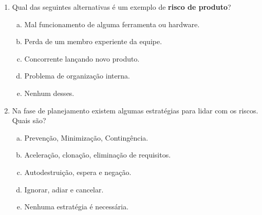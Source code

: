 \documentclass{beamer}
\begin{document}
\begin{frame}
    \begin{enumerate}
        \justifying
        \setcounter{enumi}{10}
        \item<1-2> Qual das seguintes alternativas é um exemplo de \textbf{risco de produto}?
        \begin{enumerate}[a)]
            \justifying
            \item<1-2> \alert<2>{Mal funcionamento de alguma ferramenta ou hardware}.
            \item<1-2> Perda de um membro experiente da equipe.
            \item<1-2> Concorrente lançando novo produto.
            \item<1-2> Problema de organização interna.
            \item<1-2> Nenhum desses.
        \end{enumerate}
        \item<3-4> Na fase de planejamento existem algumas estratégias para lidar com os riscos. Quais são?
        \begin{enumerate}[a)]
            \justifying
            \item<3-4> \alert<4>{Prevenção, Minimização, Contingência}.
            \item<3-4> Aceleração, clonação, eliminação de requisitos.
            \item<3-4> Autodestruição, espera e negação.
            \item<3-4> Ignorar, adiar e cancelar.
            \item<3-4> Nenhuma estratégia é necessária.
        \end{enumerate}
    \end{enumerate}
\end{frame}
\end{document}
